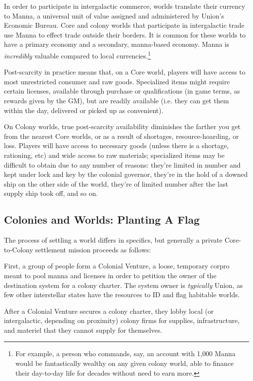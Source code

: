 In order to participate in intergalactic commerce, worlds translate their currency to Manna, a
universal unit of value assigned and administered by Union's Economic Bureau. Core and colony
worlds that participate in intergalactic trade use Manna to effect trade outside their borders. It is
common for these worlds to have a primary economy and a secondary, manna-based economy.
Manna is \textit{incredibly} valuable compared to local currencies.\footnote{For example, a person who commands,
say, an account with 1,000 Manna would be fantastically wealthy on any given colony world, able to finance
their day-to-day life for decades without need to earn more.}

Post-scarcity in practice means that, on a Core world, players will have access to most
unrestricted consumer and raw goods. Specialized items might require certain licenses, available
through purchase or qualifications (in game terms, as rewards given by the GM), but are readily
available (i.e. they can get them within the day, delivered or picked up as convenient).

On Colony worlds, true post-scarcity availability diminishes the farther you get from the nearest
Core worlds, or as a result of shortages, resource-hoarding, or loss. Players will have access to
necessary goods (unless there is a shortage, rationing, etc) and wide access to raw materials;
specialized items may be difficult to obtain due to any number of reasons: they're limited in
number and kept under lock and key by the colonial governor, they're in the hold of a downed
ship on the other side of the world, they're of limited number after the last supply ship took off,
and so on.

\subsection{Colonies and Worlds: Planting A Flag}

The process of settling a world differs in specifics, but generally a private Core-to-Colony
settlement mission proceeds as follows:

First, a group of people form a Colonial Venture, a loose, temporary corpro meant to pool manna
and licenses in order to petition the owner of the destination system for a colony charter. The
system owner is \textit{typically} Union, as few other interstellar states have the resources to ID and flag
habitable worlds.

After a Colonial Venture secures a colony charter, they lobby local (or intergalactic, depending on
proximity) colony firms for supplies, infrastructure, and materiel that they cannot supply for
themselves.


